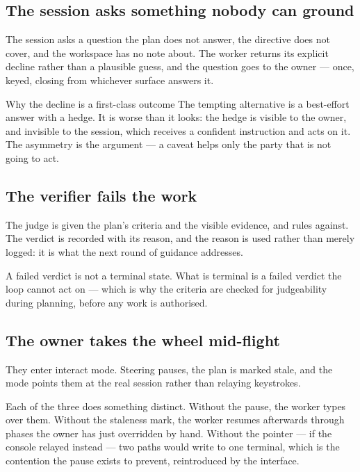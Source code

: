 \documentclass[11pt]{article}
\begin{document}
\subsection{The session asks something nobody can ground}

The session asks a question the plan does not answer, the directive does not cover, and the workspace has no note about. The worker returns its explicit decline rather than a plausible guess, and the question goes to the owner --- once, keyed, closing from whichever surface answers it.

\begin{notebox}{Why the decline is a first-class outcome}
The tempting alternative is a best-effort answer with a hedge. It is worse than it looks: the hedge is visible to the owner, and invisible to the session, which receives a confident instruction and acts on it. The asymmetry is the argument --- a caveat helps only the party that is not going to act.
\end{notebox}

\subsection{The verifier fails the work}

The judge is given the plan's criteria and the visible evidence, and rules against. The verdict is recorded with its reason, and the reason is used rather than merely logged: it is what the next round of guidance addresses.

A failed verdict is not a terminal state. What is terminal is a failed verdict the loop cannot act on --- which is why the criteria are checked for judgeability during planning, before any work is authorised.

\subsection{The owner takes the wheel mid-flight}

They enter interact mode. Steering pauses, the plan is marked stale, and the mode points them at the real session rather than relaying keystrokes.

Each of the three does something distinct. Without the pause, the worker types over them. Without the staleness mark, the worker resumes afterwards through phases the owner has just overridden by hand. Without the pointer --- if the console relayed instead --- two paths would write to one terminal, which is the contention the pause exists to prevent, reintroduced by the interface.
\end{document}
